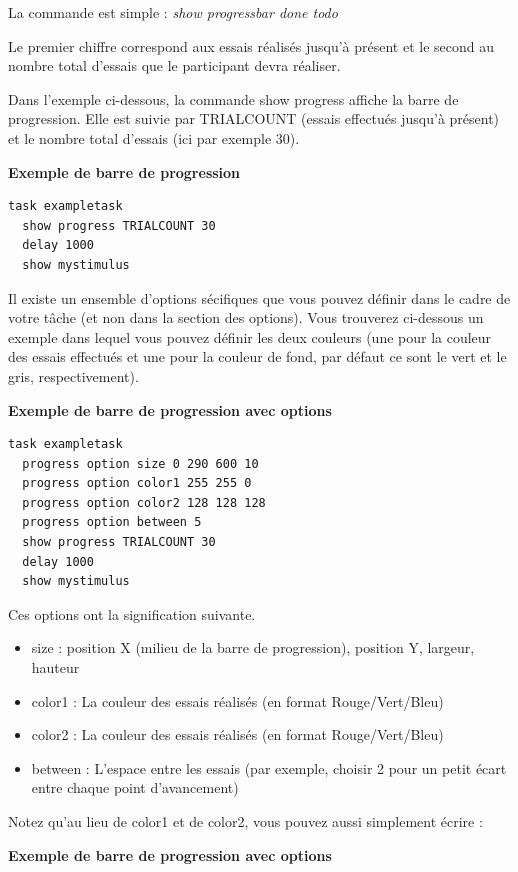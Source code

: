 \documentclass[
]{book}
\providecommand{\tightlist}{%
  \setlength{\itemsep}{0pt}\setlength{\parskip}{0pt}}
\begin{document}
La commande est simple : \emph{show progressbar done todo}

Le premier chiffre correspond aux essais réalisés jusqu'à présent et le
second au nombre total d'essais que le participant devra réaliser.

Dans l'exemple ci-dessous, la commande show progress affiche la barre de
progression. Elle est suivie par TRIALCOUNT (essais effectués jusqu'à
présent) et le nombre total d'essais (ici par exemple 30).

\textbf{Exemple de barre de progression}

\begin{verbatim}
task exampletask
  show progress TRIALCOUNT 30
  delay 1000
  show mystimulus
\end{verbatim}

Il existe un ensemble d'options sécifiques que vous pouvez définir dans
le cadre de votre tâche (et non dans la section des options). Vous
trouverez ci-dessous un exemple dans lequel vous pouvez définir les deux
couleurs (une pour la couleur des essais effectués et une pour la
couleur de fond, par défaut ce sont le vert et le gris, respectivement).

\textbf{Exemple de barre de progression avec options}

\begin{verbatim}
task exampletask
  progress option size 0 290 600 10
  progress option color1 255 255 0
  progress option color2 128 128 128
  progress option between 5
  show progress TRIALCOUNT 30
  delay 1000
  show mystimulus
\end{verbatim}

Ces options ont la signification suivante.

\begin{itemize}
\tightlist
\item
  size : position X (milieu de la barre de progression), position Y,
  largeur, hauteur
\item
  color1 : La couleur des essais réalisés (en format Rouge/Vert/Bleu)
\item
  color2 : La couleur des essais réalisés (en format Rouge/Vert/Bleu)
\item
  between : L'espace entre les essais (par exemple, choisir 2 pour un
  petit écart entre chaque point d'avancement)
\end{itemize}

Notez qu'au lieu de color1 et de color2, vous pouvez aussi simplement
écrire :

\textbf{Exemple de barre de progression avec options}
\end{document}
